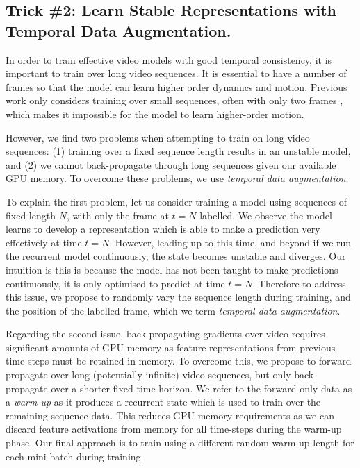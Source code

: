 \subsection{Trick \#2: Learn Stable Representations with Temporal Data Augmentation.}

In order to train effective video models with good temporal consistency, it is important to train over long video sequences. It is essential to have a number of frames so that the model can learn higher order dynamics and motion. Previous work only considers training over small sequences, often with only two frames \cite{gadde2017semantic}, which makes it impossible for the model to learn higher-order motion.

However, we find two problems when attempting to train on long video sequences: (1) training over a fixed sequence length results in an unstable model, and (2) we cannot back-propagate through long sequences given our available GPU memory. To overcome these problems, we use \textit{temporal data augmentation}.

To explain the first problem, let us consider training a model using sequences of fixed length $N$, with only the frame at $t=N$ labelled. We observe the model learns to develop a representation which is able to make a prediction very effectively at time $t=N$. However, leading up to this time, and beyond if we run the recurrent model continuously, the state becomes unstable and diverges. Our intuition is this is because the model has not been taught to make predictions continuously, it is only optimised to predict at time $t=N$. Therefore to address this issue, we propose to randomly vary the sequence length during training, and the position of the labelled frame, which we term \textit{temporal data augmentation}.

Regarding the second issue, back-propagating gradients over video requires significant amounts of GPU memory as feature representations from previous time-steps must be retained in memory. To overcome this, we propose to forward propagate over long (potentially infinite) video sequences, but only back-propagate over a shorter fixed time horizon. We refer to the forward-only data as a \textit{warm-up} as it produces a recurrent state which is used to train over the remaining sequence data. This reduces GPU memory requirements as we can discard feature activations from memory for all time-steps during the warm-up phase. Our final approach is to train using a different random warm-up length for each mini-batch during training.

